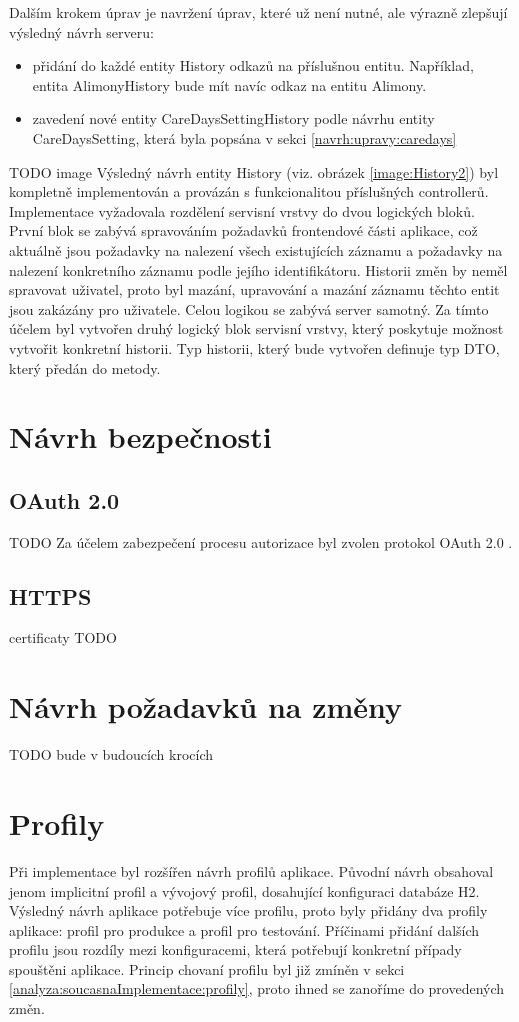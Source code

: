         Dalším krokem úprav je navržení úprav, které už není nutné, ale výrazně zlepšují výsledný návrh serveru:
        \begin{itemize}
            \item přidání do každé entity History odkazů na příslušnou entitu. Například, entita AlimonyHistory bude mít navíc odkaz na entitu Alimony.
            \item zavedení nové entity CareDaysSettingHistory podle návrhu entity CareDaysSetting, která byla popsána v sekci \ref{navrh:upravy:caredays}
        \end{itemize}
         TODO image
        Výsledný návrh entity History (viz. obrázek \ref{image:History2}) byl kompletně implementován a provázán s funkcionalitou příslušných controllerů. Implementace vyžadovala rozdělení servisní vrstvy do dvou logických bloků. První blok se zabývá spravováním požadavků frontendové části aplikace, což aktuálně jsou požadavky na nalezení všech existujících záznamu a požadavky na nalezení konkretního záznamu podle jejího identifikátoru. Historii změn by neměl spravovat uživatel, proto byl mazání, upravování a mazání záznamu těchto entit jsou zakázány pro uživatele. Celou logikou se zabývá server samotný. Za tímto účelem byl vytvořen druhý logický blok servisní vrstvy, který poskytuje možnost vytvořit konkretní historii. Typ historii, který bude vytvořen definuje typ DTO, který předán do metody.

\section{Návrh bezpečnosti}\label{navrh:bezpecnost}
    \subsection{OAuth 2.0}
        TODO Za účelem zabezpečení procesu autorizace byl zvolen protokol OAuth 2.0 . 
        
    \subsection{HTTPS}
        certificaty TODO
        
\section{Návrh požadavků na změny}\label{navrh:requests}
    TODO bude v budoucích krocích
        
\section{Profily}\label{navrh:profily}
    Při implementace byl rozšířen návrh profilů aplikace. Původní návrh obsahoval jenom implicitní profil a vývojový profil, dosahující konfiguraci databáze H2. Výsledný návrh aplikace potřebuje více profilu, proto byly přidány dva profily aplikace: profil pro produkce a profil pro testování. Příčinami přidání dalších profilu jsou rozdíly mezi konfiguracemi, která potřebují konkretní případy spouštěni aplikace. Princip chovaní profilu byl již zmíněn v sekci \ref{analyza:soucasnaImplementace:profily}, proto ihned se zanoříme do provedených změn.
    
